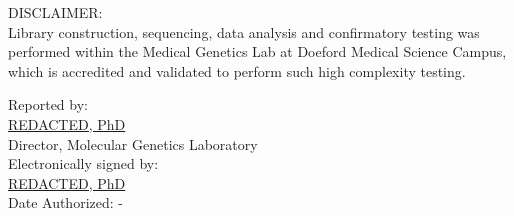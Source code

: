 \documentclass[10pt]{article}
\begin{document}
DISCLAIMER: \\
Library construction, sequencing, data analysis and confirmatory testing was performed within the Medical Genetics Lab at Doeford Medical Science Campus, which is accredited and validated to perform such high complexity testing.

\hfill \parbox{12cm}{
Reported by:\\
\underline{REDACTED, PhD}\\
Director, Molecular Genetics Laboratory \\

\vspace{1em}
Electronically signed by: \\
\underline{REDACTED, PhD}\\
Date Authorized: -
}
\end{document}
